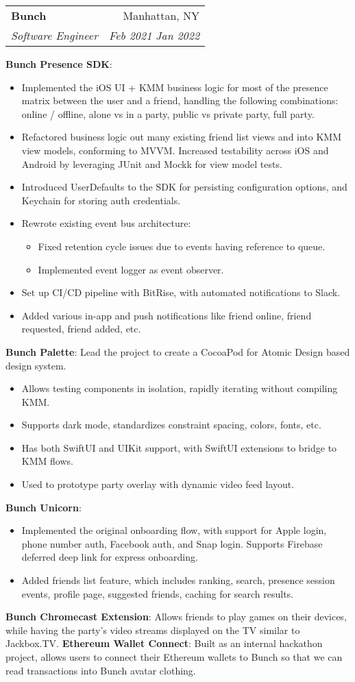 \documentclass{article}
\makeatletter
\newcommand{\resumeProject}[1]{\small{\textbf{#1}{:}}}
\newcommand{\resumeProjectWithDescription}[2]{\small{\textbf{#1}{: #2\vspace{-2pt}}}}
\newcommand{\resumeProjectItem}[1]{\item\small{{#1}}}
\newcommand{\resumeSubheading}[4]{
  \vspace{-1pt}\item
    \begin{tabular*}{0.97\textwidth}[t]{l@{\extracolsep{\fill}}r}
      \textbf{#1}&#2 \\
      \textit{\small#3}&\textit{\small#4} \\
    \end{tabular*}
}
\newcommand{\resumeItemListStart}{\vspace{-4pt}\begin{itemize}}
\newcommand{\resumeItemListEnd}{\end{itemize}\vspace{-4pt}}
\makeatother
\begin{document}
    \resumeSubheading{Bunch}{Manhattan, NY}{Software Engineer}{Feb 2021 \textendash{} Jan 2022}
      \resumeProject{Bunch Presence SDK}
      \resumeItemListStart{}
        \resumeProjectItem{Implemented the iOS UI + KMM business logic for most of the presence matrix between the user and a friend, handling the following combinations: online / offline, alone vs in a party, public vs private party, full party.}
        \resumeProjectItem{Refactored business logic out many existing friend list views and into KMM view models, conforming to MVVM. Increased testability across iOS and Android by leveraging JUnit and Mockk for view model tests.}
        \resumeProjectItem{Introduced UserDefaults to the SDK for persisting configuration options, and Keychain for storing auth credentials.}
        \resumeProjectItem{Rewrote existing event bus architecture:}
        \resumeItemListStart{}
          \resumeProjectItem{Fixed retention cycle issues due to events having reference to queue.}
          \resumeProjectItem{Implemented event logger as event observer.}
        \resumeItemListEnd{}
        \resumeProjectItem{Set up CI/CD pipeline with BitRise, with automated notifications to Slack.}
        \resumeProjectItem{Added various in-app and push notifications like friend online, friend requested, friend added, etc.}
      \resumeItemListEnd{}
      \resumeProjectWithDescription{Bunch Palette}{Lead the project to create a CocoaPod for Atomic Design based design system.}
      \resumeItemListStart{}
        \resumeProjectItem{Allows testing components in isolation, rapidly iterating without compiling KMM.}
        \resumeProjectItem{Supports dark mode, standardizes constraint spacing, colors, fonts, etc.}
        \resumeProjectItem{Has both SwiftUI and UIKit support, with SwiftUI extensions to bridge to KMM flows.}
        \resumeProjectItem{Used to prototype party overlay with dynamic video feed layout.}
      \resumeItemListEnd{}
      \resumeProject{Bunch Unicorn}
      \resumeItemListStart{}
        \resumeProjectItem{Implemented the original onboarding flow, with support for Apple login, phone number auth, Facebook auth, and Snap login\@. Supports Firebase deferred deep link for express onboarding.}
        \resumeProjectItem{Added friends list feature, which includes ranking, search, presence session events, profile page, suggested friends, caching for search results.}
      \resumeItemListEnd{}
      \resumeProjectWithDescription{Bunch Chromecast Extension}
        {Allows friends to play games on their devices, while having the party's video streams displayed on the TV similar to Jackbox.TV.}
      \resumeProjectWithDescription{Ethereum Wallet Connect}
        {Built as an internal hackathon project, allows users to connect their Ethereum wallets to Bunch so that we can read transactions into Bunch avatar clothing.}
\end{document}
